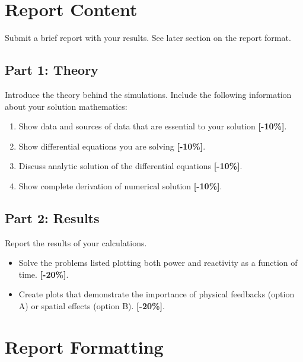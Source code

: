 \documentclass{article}
\begin{document}
\section{Report Content}
Submit a brief report with your results. 
See later section on the report format.

\subsection{Part 1: Theory}
Introduce the theory behind the simulations. Include the following information 
about your solution mathematics:

\begin{enumerate}
        \item Show data and sources of data that are essential to your solution {\color{red}\textbf{[-10\%]}}.
        \item Show differential equations you are solving  {\color{red}\textbf{[-10\%]}}.
        \item Discuss analytic solution of the differential equations  {\color{red}\textbf{[-10\%]}}.
        \item Show complete derivation of numerical solution {\color{red}\textbf{[-10\%]}}.
\end{enumerate}

\subsection{Part 2: Results}

Report the results of your calculations.

\begin{itemize}
        \item Solve the problems listed plotting both power and reactivity as a function of time.  
                {\color{red}\textbf{[-20\%]}}.
        \item Create plots that demonstrate the importance of physical 
                feedbacks (option A) or spatial effects (option B).
                {\color{red}\textbf{[-20\%]}}.
\end{itemize}

\section{Report Formatting}
\end{document}
